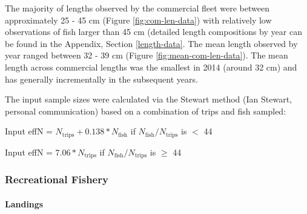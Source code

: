 \documentclass[11pt,
  english,
  a4paper,
]{article}
\begin{document}
\leavevmode\tagmcend\tagstructend\par


The majority of lengths observed by the commercial fleet were between approximately 25 - 45 cm (Figure \ref{fig:com-len-data}) with relatively low observations of fish larger than 45 cm (detailed length compositions by year can be found in the Appendix, Section \ref{length-data}. The mean length observed by year ranged between 32 - 39 cm (Figure \ref{fig:mean-com-len-data}). The mean length across commercial lengths was the smallest in 2014 (around 32 cm) and has generally incrementally in the subsequent years.

\leavevmode\tagmcend\tagstructend\par


The input sample sizes were calculated via the Stewart method (Ian Stewart, personal communication) based on a combination of trips and fish sampled:

\leavevmode\tagmcend\tagstructend\par

\begin{centering}

Input effN = $N_{\text{trips}} + 0.138 * N_{\text{fish}}$ if $N_{\text{fish}}/N_{\text{trips}}$ is $<$ 44

Input effN = $7.06 * N_{\text{trips}}$ if $N_{\text{fish}}/N_{\text{trips}}$ is $\geq$ 44

\end{centering}


\hypertarget{recreational-fishery}{%
\subsubsection{Recreational Fishery}\label{recreational-fishery}}

\leavevmode\tagmcend\tagstructend


\hypertarget{landings-1}{%
\paragraph{Landings}\label{landings-1}}

\leavevmode\tagmcend\tagstructend
\end{document}
